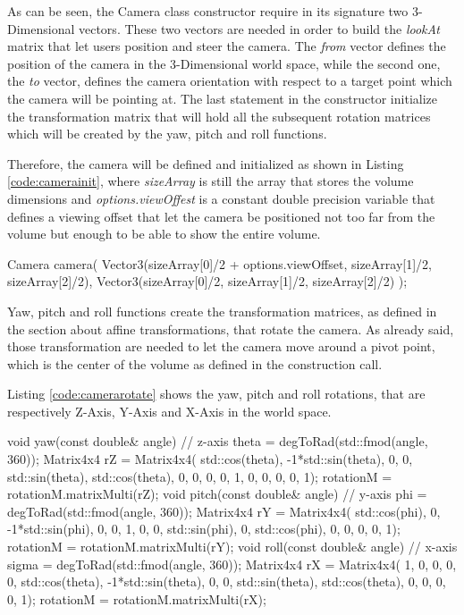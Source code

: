 \documentclass[12pt,a4paper]{extarticle}
\newcommand{\linespace}{\vspace{8pt}}
\begin{document}
As can be seen, the Camera class constructor require in its signature two 3-Dimensional vectors. These two vectors are needed in order to build the \textit{lookAt} matrix that let users position and steer the camera. The \textit{from} vector defines the position of the camera in the 3-Dimensional world space, while the second one, the \textit{to} vector, defines the camera orientation with respect to a target point which the camera will be pointing at.
The last statement in the constructor initialize the transformation matrix that will hold all the subsequent rotation matrices which will be created by the yaw, pitch and roll functions.
\linespace

Therefore, the camera will be defined and initialized as shown in Listing \ref{code:camerainit}, where \textit{sizeArray} is still the array that stores the volume dimensions and \textit{options.viewOffest} is a constant double precision variable that defines a viewing offset that let the camera be positioned not too far from the volume but enough to be able to show the entire volume.

\begin{cpp}[caption={Camera definition and initialization.},label=code:camerainit]
Camera camera(
	Vector3(sizeArray[0]/2 + options.viewOffset, 
		sizeArray[1]/2, sizeArray[2]/2), 
	Vector3(sizeArray[0]/2, sizeArray[1]/2, sizeArray[2]/2)
	);
\end{cpp} 

Yaw, pitch and roll functions create the transformation matrices, as defined in the section about affine transformations, that rotate the camera. As already said, those transformation are needed to let the camera move around a pivot point, which is the center of the volume as defined in the construction call.

Listing \ref{code:camerarotate} shows the yaw, pitch and roll rotations, that are respectively Z-Axis, Y-Axis and X-Axis in the world space.

\begin{cpp}[caption={},label=code:camerarotate]
void yaw(const double& angle) { // z-axis
	theta = degToRad(std::fmod(angle, 360));
	Matrix4x4 rZ = Matrix4x4(
		std::cos(theta), -1*std::sin(theta), 0, 0,
		std::sin(theta), std::cos(theta), 0, 0,
		0, 0, 1, 0,
		0, 0, 0, 1);
	rotationM = rotationM.matrixMulti(rZ);
}
void pitch(const double& angle) { // y-axis
	phi = degToRad(std::fmod(angle, 360));
	Matrix4x4 rY = Matrix4x4(
		std::cos(phi), 0, -1*std::sin(phi), 0,
		0, 1, 0, 0,
		std::sin(phi), 0, std::cos(phi), 0,
		0, 0, 0, 1);
	rotationM = rotationM.matrixMulti(rY);
}
void roll(const double& angle) { // x-axis
	sigma = degToRad(std::fmod(angle, 360));
	Matrix4x4 rX = Matrix4x4(
		1, 0, 0, 0,
		0, std::cos(theta), -1*std::sin(theta), 0,
		0, std::sin(theta), std::cos(theta), 0,
		0, 0, 0, 1);
	rotationM = rotationM.matrixMulti(rX);
}
\end{cpp}
\end{document}
